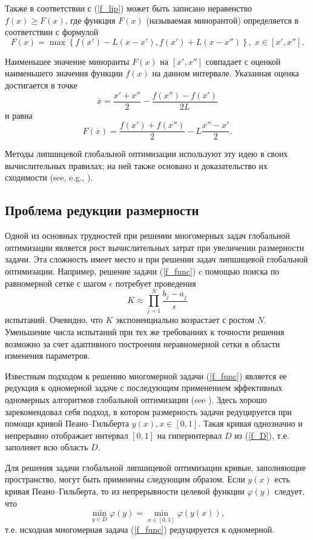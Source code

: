 \documentclass[preprint,12pt]{elsarticle}
\begin{document}
Также в соответствии с (\ref{f_lip}) может быть записано неравенство $f(x) \geq F(x)$, где функция $F(x)$ (называемая минорантой) определяется в соответствии с формулой
\[
F(x) = \max\left\{f(x') - L(x-x'),f(x') + L(x-x'')\right\}, \; x\in [x', x''].
\] 

Наименьшее значение миноранты $F(x)$ на $[x', x'']$ совпадает с оценкой наименьшего значения функции $f(x)$ на данном интервале. Указанная оценка достигается в точке 
\[
\overline{x} = \frac{x'+x''}{2}-\frac{f(x'')-f(x')}{2L}
\] 
и равна
\[
F(\overline{x}) = \frac{f(x')+f(x'')}{2} -L \frac{x''-x'}{2}.
\]

Методы липшицевой глобальной оптимизации используют эту идею в своих вычислительных правилах; на ней также основано и доказательство их сходимости (see, e.g.,
\cite{Jones2021,PaulaviciusZilinskas2014,Sergeyev2013,Evtushenko2013}).

\subsection{Проблема редукции размерности} 

Одной из основных трудностей при решении многомерных задач глобальной оптимизации является рост вычислительных затрат при увеличении размерности задачи. Эта сложность имеет место и при решении задач липшицевой глобальной оптимизации.
Например, решение задачи (\ref{f_func}) c помощью поиска по равномерной сетке с шагом $\epsilon$ потребует проведения 
\[
K \approx \prod_{j=1}^N{\frac{b_j-a_j}{\epsilon}}
\]
испытаний. Очевидно, что $K$ экспоненциально возрастает с ростом $N$.
Уменьшение числа испытаний при тех же требованиях к точности решения возможно за счет адаптивного построения неравномерной сетки в области изменения параметров.

Известным подходом к решению многомерной задачи (\ref{f_func}) является ее редукция к одномерной задаче с последующим применением эффективных одномерных алгоритмов глобальной оптимизации (see \cite{Strongin2000,Sergeyev2013}). Здесь хорошо зарекомендовал себя подход, в котором размерность задачи редуцируется при помощи кривой Пеано–Гильберта $y(x), x \in [0, 1]$.
Такая кривая однозначно и непрерывно отображает интервал $[0, 1]$ на гиперинтервал $D$ из (\ref{f_D}), т.е. заполняет всю область $D$.

Для решения задачи глобальной липшицевой оптимизации кривые, заполняющие пространство, могут быть применены следующим образом.
Если $y(x)$ есть кривая Пеано–Гильберта, то из непрерывности целевой функции $\varphi(y)$ следует, что
\[
\min_{y \in D } \varphi(y) = \min_{x \in [0,1] } \varphi(y(x)),
\]
т.е. исходная многомерная задача (\ref{f_func}) редуцируется к одномерной.
\end{document}

